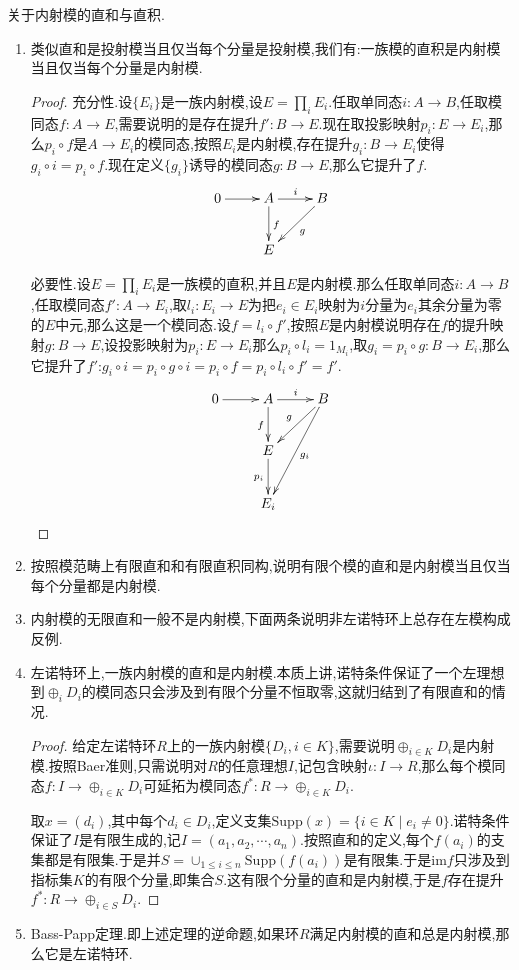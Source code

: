 关于内射模的直和与直积.
\begin{enumerate}
	\item 类似直和是投射模当且仅当每个分量是投射模,我们有:一族模的直积是内射模当且仅当每个分量是内射模.
	\begin{proof}
		
		充分性.设$\{E_i\}$是一族内射模,设$E=\prod_iE_i$.任取单同态$i:A\to B$,任取模同态$f:A\to E$,需要说明的是存在提升$f':B\to E$.现在取投影映射$p_i:E\to E_i$,那么$p_i\circ f$是$A\to E_i$的模同态,按照$E_i$是内射模,存在提升$g_i:B\to E_i$使得$g_i\circ i=p_i\circ f$.现在定义$\{g_i\}$诱导的模同态$g:B\to E$,那么它提升了$f$.
		$$\xymatrix{0\ar[r]&A\ar[r]^i\ar[d]^{f}&B\ar[dl]^g\\&E&}$$
		
		必要性.设$E=\prod_iE_i$是一族模的直积,并且$E$是内射模.那么任取单同态$i:A\to B$,任取模同态$f':A\to E_i$,取$l_i:E_i\to E$为把$e_i\in E_i$映射为$i$分量为$e_i$其余分量为零的$E$中元,那么这是一个模同态.设$f=l_i\circ f'$,按照$E$是内射模说明存在$f$的提升映射$g:B\to E$,设投影映射为$p_i:E\to E_i$那么$p_i\circ l_i=1_{M_i}$,取$g_i=p_i\circ g:B\to E_i$,那么它提升了$f'$:$g_i\circ i=p_i\circ g\circ i=p_i\circ f=p_i\circ l_i\circ f'=f'$.
		$$\xymatrix{0\ar[r]&A\ar[d]_f\ar[r]^i&B\ar[dl]_g\ar[ddl]^{g_i}\\&E\ar[d]_{p_i}&\\&E_i&}$$
	\end{proof}
	\item 按照模范畴上有限直和和有限直积同构,说明有限个模的直和是内射模当且仅当每个分量都是内射模.
	\item 内射模的无限直和一般不是内射模,下面两条说明非左诺特环上总存在左模构成反例.
	\item 左诺特环上,一族内射模的直和是内射模.本质上讲,诺特条件保证了一个左理想到$\oplus_iD_i$的模同态只会涉及到有限个分量不恒取零,这就归结到了有限直和的情况.
	\begin{proof}
		
		给定左诺特环$R$上的一族内射模$\{D_i,i\in K\}$,需要说明$\oplus_{i\in K}D_i$是内射模.按照Baer准则,只需说明对$R$的任意理想$I$,记包含映射$\iota:I\to R$,那么每个模同态$f:I\to\oplus_{i\in K}D_i$可延拓为模同态$f^*:R\to\oplus_{i\in K}D_i$.
		
		取$x=(d_i)$,其中每个$d_i\in D_i$,定义支集$\mathrm{Supp}(x)=\{i\in K\mid e_i\not=0\}$.诺特条件保证了$I$是有限生成的,记$I=(a_1,a_2,\cdots,a_n)$.按照直和的定义,每个$f(a_i)$的支集都是有限集.于是并$S=\cup_{1\le i\le n}\mathrm{Supp}(f(a_i))$是有限集.于是$\mathrm{im}f$只涉及到指标集$K$的有限个分量,即集合$S$.这有限个分量的直和是内射模,于是$f$存在提升$f^*:R\to\oplus_{i\in S}D_i$.
	\end{proof}
    \item Bass-Papp定理.即上述定理的逆命题,如果环$R$满足内射模的直和总是内射模,那么它是左诺特环.
\end{enumerate}

